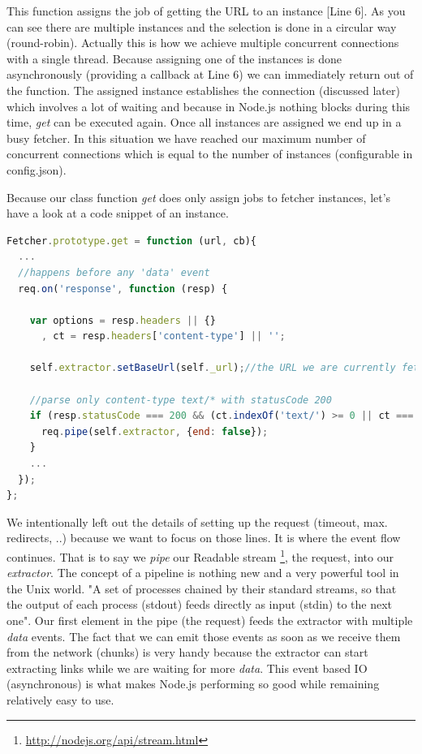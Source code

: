 This function assigns the job of getting the URL to an instance [Line 6]. As you can see there are multiple instances and the selection is done in a circular way (round-robin). Actually this is how we achieve multiple concurrent connections with a single thread. Because assigning one of the instances is done asynchronously (providing a callback at Line 6) we can immediately return out of the function. The assigned instance establishes the connection (discussed later) which involves a lot of waiting and because in Node.js nothing blocks during this time, \emph{get} can be executed again. Once all instances are assigned we end up in a busy fetcher. In this situation we have reached our maximum number of concurrent connections which is equal to the number of instances (configurable in config.json).

Because our class function \emph{get} does only assign jobs to fetcher instances, let's have a look at a code snippet of an instance.

\begin{lstlisting}[language=JavaScript]
Fetcher.prototype.get = function (url, cb){
  ...
  //happens before any 'data' event
  req.on('response', function (resp) {

    var options = resp.headers || {}
      , ct = resp.headers['content-type'] || '';

    self.extractor.setBaseUrl(self._url);//the URL we are currently fetching

    //parse only content-type text/* with statusCode 200
    if (resp.statusCode === 200 && (ct.indexOf('text/') >= 0 || ct === '')) {
      req.pipe(self.extractor, {end: false});
    }
    ...
  });
};
\end{lstlisting}

We intentionally left out the details of setting up the request (timeout, max. redirects, ..) because we want to focus on those lines. It is where the event flow continues. That is to say we \emph{pipe} our Readable stream \footnote{\url{http://nodejs.org/api/stream.html}}, the request, into our \emph{extractor}. The concept of a pipeline is nothing new and a very powerful tool in the Unix world. "A set of processes chained by their standard streams, so that the output of each process (stdout) feeds directly as input (stdin) to the next one"\cite{wiki:pipeline_unix}. Our first element in the pipe (the request) feeds the extractor with multiple \emph{data} events. The fact that we can emit those events as soon as we receive them from the network (chunks) is very handy because the extractor can start extracting links while we are waiting for more \emph{data}. This event based IO (asynchronous) is what makes Node.js performing so good while remaining relatively easy to use.

